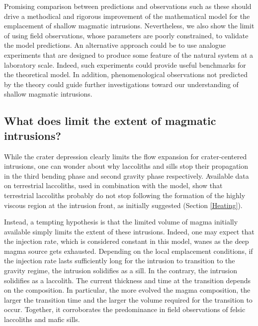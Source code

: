 Promising  comparison between  predictions  and  observations such  as
these  should  drive a  methodical  and  rigorous improvement  of  the
mathematical model for the emplacement of shallow magmatic intrusions.
Nevertheless,  we also  show the  limit of  using field  observations,
whose  parameters  are  poorly  constrained,  to  validate  the  model
predictions.   An  alternative  approach  could  be  to  use  analogue
experiments that are  designed to produce some feature  of the natural
system at a  laboratory scale. Indeed, such  experiments could provide
useful   benchmarks  for   the   theoretical   model.   In   addition,
phenomenological observations not predicted  by the theory could guide
further investigations  toward our  understanding of  shallow magmatic
intrusions.

\subsection{What does limit the extent of magmatic intrusions?}
\label{sec:summary-2}

While  the crater  depression clearly  limits the  flow expansion  for
crater-centered intrusions,  one can  wonder about why  laccoliths and
sills stop  their propagation  in the third  bending phase  and second
gravity phase respectively. Available  data on terrestrial laccoliths,
used in combination  with the model, show  that terrestrial laccoliths
probably do  not stop  following the formation  of the  highly viscous
region  at  the  intrusion  front,  as  initially  suggested  (Section
\ref{Heating}).

Instead, a  tempting hypothesis  is that the  limited volume  of magma
initially   available    simply   limits    the   extent    of   these
intrusions. Indeed, one  may expect that the injection  rate, which is
considered constant in this model, wanes as the deep magma source gets
exhausted.   Depending on  the  local emplacement  conditions, if  the
injection rate lasts sufficiently long for the intrusion to transition
to the  gravity regime, the  intrusion solidifies  as a sill.   In the
contrary,  the  intrusion  solidifies  as a  laccolith.   The  current
thickness and  time at the  transition depends on the  composition. In
particular, the  more evolved  the magma  composition, the  larger the
transition time and the larger  the volume required for the transition
to  occur.   Together,  it  corroborates  the  predominance  in  field
observations of felsic laccoliths and mafic sills.

